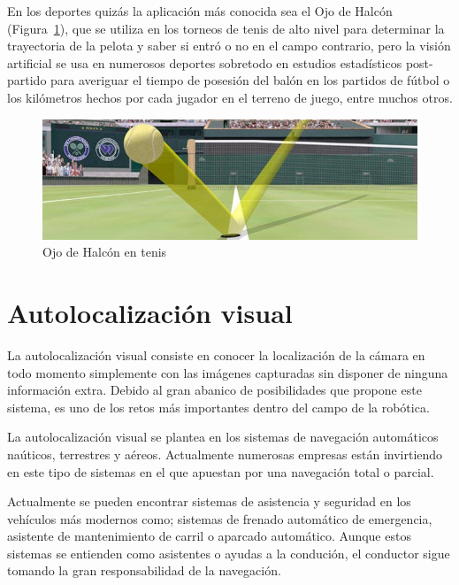 En los deportes quizás la aplicación más conocida sea el Ojo de Halcón (Figura~\ref{fig:Ojohalcon}), que se utiliza en los torneos de tenis de alto nivel para determinar la trayectoria de la pelota y saber si entró o no en el campo contrario, pero la visión artificial se usa en numerosos deportes sobretodo en estudios estadísticos post-partido para averiguar el tiempo de posesión del balón en los partidos de fútbol o los kilómetros hechos por cada jugador en el terreno de juego, entre muchos otros.

\begin{figure}[th]
\centering
\includegraphics[scale=0.6]{Figures/ojohalcon.jpg}
\decoRule
\caption[Ojo de halcón]{Ojo de Halcón en tenis}
\label{fig:Ojohalcon}
\end{figure}

\section{Autolocalización visual}
La autolocalización visual consiste en conocer la localización de la cámara en todo momento simplemente con las imágenes capturadas sin disponer de ninguna información extra. Debido al gran abanico de posibilidades que propone este sistema, es uno de los retos más importantes dentro del campo de la robótica.

La autolocalización visual se plantea en los sistemas de navegación automáticos naúticos, terrestres y aéreos. Actualmente numerosas empresas están invirtiendo en este tipo de sistemas en el que apuestan por una navegación total o parcial.

Actualmente se pueden encontrar sistemas de asistencia y seguridad en los vehículos más modernos como; sistemas de frenado automático de emergencia, asistente de mantenimiento de carril o aparcado automático. Aunque estos sistemas se entienden como asistentes o ayudas a la condución, el conductor sigue tomando la gran responsabilidad de la navegación.

